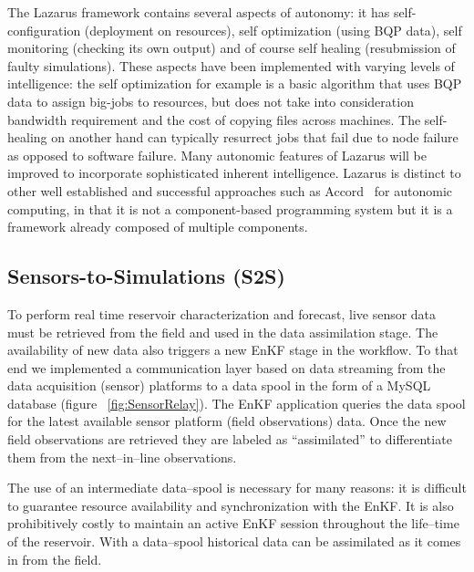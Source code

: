 \documentclass{acm_proc_article-sp}
\newcommand{\jhanote}[1]{ {\textcolor{red} { ***Jha: #1 }}}
\newcommand{\yyenote}[1]{ {\textcolor{blue} { ***yye00: #1 }}}
\newcommand{\jhanote}[1]{}
\newcommand{\yyenote}[1]{}
\begin{document}
The Lazarus framework contains several aspects of autonomy: it has
self-configuration (deployment on resources), self optimization (using
BQP data), self monitoring (checking its own output) and of course
self healing (resubmission of faulty simulations). These aspects have
been implemented with varying levels of intelligence: the self
optimization for example is a basic algorithm that uses BQP data to
assign big-jobs to resources, but does not take into consideration
bandwidth requirement and the cost of copying files across
machines. The self-healing on another hand can typically resurrect
jobs that fail due to node failure as opposed to software
failure. Many autonomic features of Lazarus will be improved to
incorporate sophisticated inherent intelligence.  Lazarus is distinct
to other well established and successful approaches such as
Accord~\cite{accord} for autonomic computing, in that it is not a
component-based programming system but it is a framework already
composed of multiple components.


\subsection{Sensors-to-Simulations (S2S)} 

To perform real time reservoir characterization and forecast, live
sensor data must be retrieved from the field and used in the data
assimilation stage. The availability of new data also triggers a new
EnKF stage in the workflow. To that end we implemented a communication
layer based on data streaming from the data acquisition (sensor)
platforms to a data spool in the form of a MySQL database (figure
~\ref{fig:SensorRelay}). The EnKF application queries the data
spool for the latest available sensor platform (field observations)
data. Once the new field observations are retrieved they are labeled
as ``assimilated'' to differentiate them from the next--in--line
observations.

The use of an intermediate data--spool is necessary for many reasons:
it is difficult to guarantee resource availability and synchronization
with the EnKF. It is also prohibitively costly to maintain an active
EnKF session throughout the life--time of the reservoir. With a data--spool
historical data can be assimilated as it comes in from the field.

\end{document}
